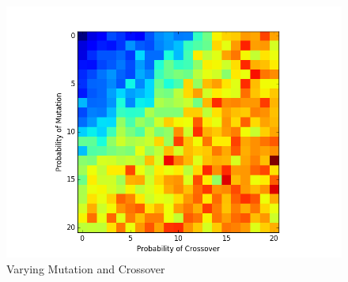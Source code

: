 \documentclass{article}
\begin{document}
\begin{figure}[ht]
\centering
\includegraphics[width=1\textwidth]{Figures/heatmap}

\caption{Varying Mutation and Crossover}
\label{fig:calibration}
\end{figure}
\end{document}
